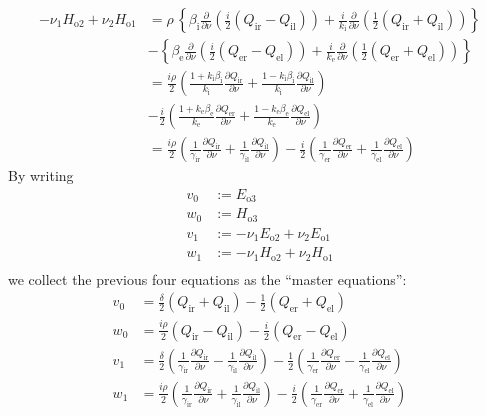 \begin{align*}
  -\nu_1 H_{\text{o}2} + \nu_2 H_{\text{o}1} &= \rho\,\left\{\beta_\text{i}\frac{\partial}{\partial\nu}\left(\frac{i}{2}(Q_\text{ir} - Q_\text{il})\right) + \frac{i}{k_\text{i}}\frac{\partial}{\partial\nu}\left(\frac{1}{2}\left(Q_\text{ir} + Q_\text{il}\right)\right)\right\} \\
  &-\left\{\beta_\text{e}\frac{\partial}{\partial\nu}\left(\frac{i}{2}(Q_\text{er} - Q_\text{el})\right) + \frac{i}{k_\text{e}}\frac{\partial}{\partial\nu}\left(\frac{1}{2}\left(Q_\text{er} + Q_\text{el}\right)\right)\right\} \\
  &=\frac{i\rho}{2}\left(\frac{1 + k_\text{i}\beta_\text{i}}{k_\text{i}}\frac{\partial Q_\text{ir}}{\partial\nu} + \frac{1 - k_\text{i}\beta_\text{i}}{k_\text{i}}\frac{\partial Q_\text{il}}{\partial\nu}\right) \\
  &-\frac{i}{2}\left(\frac{1 + k_\text{e}\beta_\text{e}}{k_\text{e}}\frac{\partial Q_\text{er}}{\partial\nu} + \frac{1 - k_\text{e}\beta_\text{e}}{k_\text{e}}\frac{\partial Q_\text{el}}{\partial\nu}\right) \\
  &=\frac{i\rho}{2}\left(\frac{1}{\gamma_\text{ir}}\frac{\partial Q_\text{ir}}{\partial\nu} + \frac{1}{\gamma_\text{il}}\frac{\partial Q_\text{il}}{\partial\nu}\right) -\frac{i}{2}\left(\frac{1}{\gamma_\text{er}}\frac{\partial Q_\text{er}}{\partial\nu} + \frac{1}{\gamma_\text{el}}\frac{\partial Q_\text{el}}{\partial\nu}\right)
\end{align*}
By writing
\begin{equation}
\begin{split}
  v_0 &:= E_{\text{o}3} \\
  w_0 &:= H_{\text{o}3} \\
  v_1 &:= -\nu_1 E_{\text{o}2} + \nu_2 E_{\text{o}1} \\
  w_1 &:= -\nu_1 H_{\text{o}2} + \nu_2 H_{\text{o}1} \\
\end{split}
\end{equation}
we collect the previous four equations as the ``master equations'':
\begin{equation}\label{eq:master}
\begin{split}
  v_0 &= \frac{\delta}{2}(Q_\text{ir} + Q_\text{il}) - \frac{1}{2}(Q_\text{er} + Q_\text{el}) \\
  w_0 &= \frac{i\rho}{2}(Q_\text{ir} - Q_\text{il}) -\frac{i}{2}(Q_\text{er} - Q_\text{el}) \\
  v_1 &=\frac{\delta}{2}\left(\frac{1}{\gamma_\text{ir}}\frac{\partial Q_\text{ir}}{\partial\nu} - \frac{1}{\gamma_\text{il}}\frac{\partial Q_\text{il}}{\partial\nu}\right) -\frac{1}{2}\left(\frac{1}{\gamma_\text{er}}\frac{\partial Q_\text{er}}{\partial\nu} - \frac{1}{\gamma_\text{el}}\frac{\partial Q_\text{el}}{\partial\nu}\right) \\
  w_1 &=\frac{i\rho}{2}\left(\frac{1}{\gamma_\text{ir}}\frac{\partial Q_\text{ir}}{\partial\nu} + \frac{1}{\gamma_\text{il}}\frac{\partial Q_\text{il}}{\partial\nu}\right) -\frac{i}{2}\left(\frac{1}{\gamma_\text{er}}\frac{\partial Q_\text{er}}{\partial\nu} + \frac{1}{\gamma_\text{el}}\frac{\partial Q_\text{el}}{\partial\nu}\right) 
\end{split}
\end{equation}
